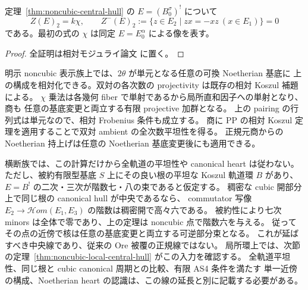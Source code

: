 \begin{lemma}
\label{lem:noncubic-no-quadratic-anticenter}
定理~\ref{thm:noncubic-central-hull} の \(E=(B_0^\sigma)^!\) について
\[
 Z(E)_2=k\chi,\qquad
 Z^-(E)_2:=\{z\in E_2\mid zx=-xz\ (x\in E_1)\}=0
\]
である。最初の式の \(\chi\) は同定 \(E=E_0^\alpha\) による像を表す。
\end{lemma}
\begin{proof}
全証明は相対モジュライ論文 \cite[\texttt{noncubic_central_hull}]{QuadricModuli2026} に置く。
\end{proof}


\begin{remark}[相対化と横断族への適用で分ける入力]
明示 noncubic 表示族上では、\(2\theta\) が単元となる任意の可換 Noetherian 基底に
上の構成を相対化できる。双対の各次数の projectivity は既存の相対 Koszul 補題による。
\(\chi\) 乗法は各幾何 fiber で単射であるから局所直和因子への単射となり、商も
任意の基底変更と両立する有限 projective 加群となる。
上の pairing の行列式は単元なので、相対 Frobenius 条件も成立する。
商に PP の相対 Koszul 定理を適用することで双対 ambient の全次数平坦性を得る。
正規元商からの Noetherian 持上げは任意の Noetherian 基底変更後にも適用できる。

横断族では、この計算だけから全軌道の平坦性や canonical heart は従わない。
ただし、被約有限型基底 \(S\) 上にその良い根の平坦な Koszul 軌道環 \(B\) があり、
\(E=B^!\) の二次・三次が階数七・八の束であると仮定する。
稠密な cubic 開部分上で同じ根の canonical hull が中央であるなら、
commutator 写像 \(E_2\to\mathcal Hom(E_1,E_3)\) の階数は稠密開で高々六である。
被約性により七次 minors は全体で零であり、上の定理は noncubic 点で階数六を与える。
従ってその点の近傍で核は任意の基底変更と両立する可逆部分束となる。
これが延ばすべき中央線であり、従来の Ore 被覆の正規線ではない。
局所環上では、次節の定理~\ref{thm:noncubic-local-central-hull} がこの入力を確認する。
全軌道平坦性、同じ根と cubic canonical 周期との比較、有限 AS4 条件を満たす
単一近傍の構成、Noetherian heart の認識は、この線の延長と別に記載する必要がある。
\end{remark}
